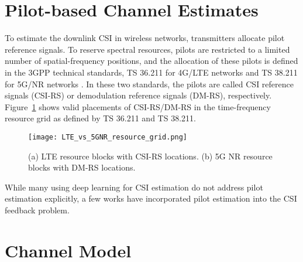 \section{Pilot-based Channel Estimates}
\label{sect:pilots}

To estimate the downlink CSI in wireless networks, transmitters allocate pilot reference signals. To reserve spectral resources, pilots are restricted to a limited number of spatial-frequency positions, and the allocation of these pilots is defined in the 3GPP technical standards, TS 36.211 for 4G/LTE networks \cite{ref:3gpp.36.211} and TS 38.211 for 5G/NR networks \cite{ref:3GPPTS38.211V15.8.0}. In these two standards, the pilots are called CSI reference signals (CSI-RS) or demodulation reference signals (DM-RS), respectively. Figure~\ref{fig:lte-vs-5g} shows valid placements of CSI-RS/DM-RS in the time-frequency resource grid as defined by TS 36.211 and TS 38.211.

\begin{figure}[!hbtp]
    \centering
    \texttt{[image: LTE\_vs\_5GNR\_resource\_grid.png]}
    \caption{(a) LTE resource blocks with CSI-RS locations. (b) 5G NR resource blocks with DM-RS locations.}
    \label{fig:lte-vs-5g}
\end{figure}

While many using deep learning for CSI estimation do not address pilot estimation explicitly, a few works have incorporated pilot estimation into the CSI feedback problem. 

\section{Channel Model}
\label{sect:channel_model}

